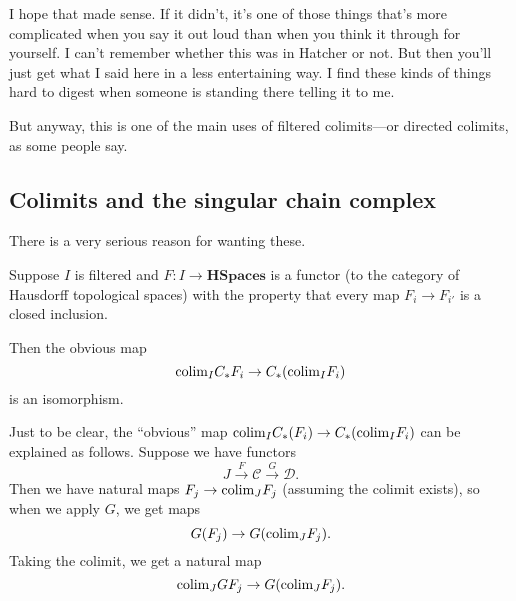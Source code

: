 I hope that made sense. If it didn't, it's one of those things that's more
complicated when you say it out loud than when you think it through for
yourself. I can't remember whether this was in Hatcher or not.
But then you'll just get what I said here in a less entertaining way. I find
these kinds of things hard to digest when someone is standing there telling it
to me. 

But anyway, this is one of the main uses of filtered colimits---or directed
colimits, as some people say.  

\subsection{Colimits and the singular chain complex} There is a very serious reason for wanting these.  

\begin{proposition} 
Suppose $I$ is filtered and $F: I \to \mathbf{HSpaces}$ is a functor (to the
category of Hausdorff topological spaces) with the
property that every map $F_i \to F_{i'}$ is a closed inclusion.

Then the obvious map
\[ \mathrm{colim}_I C_* F_i \to C_* (\mathrm{colim}_I F_i)  \]
is an isomorphism.
\end{proposition} 

Just to be clear, the ``obvious'' map $\mathrm{colim}_I C_*(F_i) \to C_*(\mathrm{colim}_I F_i)$
can be explained as follows. Suppose we have functors
\[ J \stackrel{F}{\to} \mathcal{C} \stackrel{G}{\to} \mathcal{D}. \]
Then we have natural maps $F_j \to \mathrm{colim}_J F_j$ (assuming the colimit exists),
so when we apply $G$, we get maps
\[ G(F_j) \to G(\mathrm{colim}_J F_j).  \]
Taking the colimit, we get a natural map
\[ \mathrm{colim}_J GF_j \to G(\mathrm{colim}_J F_j).  \]


